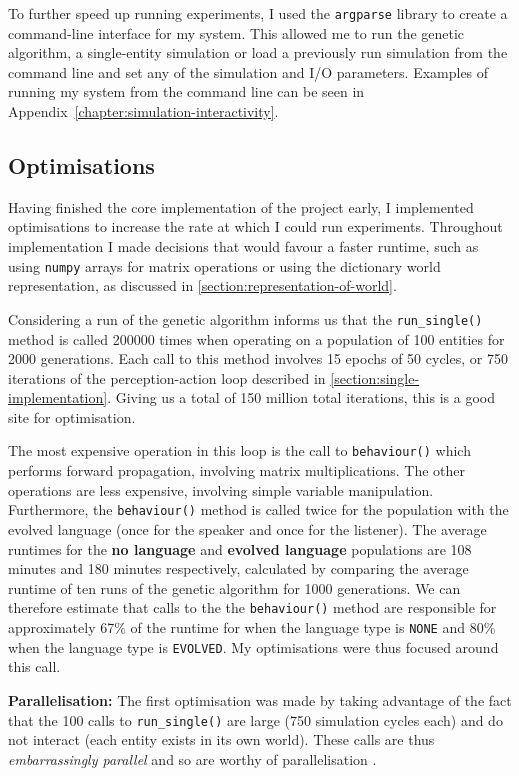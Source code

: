 \documentclass[12pt,a4paper]{report}
\begin{document}
To further speed up running experiments, I used the \texttt{argparse} library to create a command-line interface for my system. This allowed me to run the genetic algorithm, a single-entity simulation or load a previously run simulation from the command line and set any of the simulation and I/O parameters. Examples of running my system from the command line can be seen in Appendix~\ref{chapter:simulation-interactivity}.

\subsection{Optimisations}\label{section:optimisations}

Having finished the core implementation of the project early, I implemented optimisations to increase the rate at which I could run experiments. Throughout implementation I made decisions that would favour a faster runtime, such as using \verb|numpy| arrays for matrix operations or using the dictionary world representation, as discussed in \cref{section:representation-of-world}.

Considering a run of the genetic algorithm informs us that the \texttt{run\_single()} method is called 200000 times when operating on a population of 100 entities for 2000 generations. Each call to this method involves 15 epochs of 50 cycles, or 750 iterations of the perception-action loop described in \cref{section:single-implementation}. Giving us a total of 150 million total iterations, this is a good site for optimisation.

The most expensive operation in this loop is the call to \texttt{behaviour()} which performs forward propagation, involving matrix multiplications. The other operations are less expensive, involving simple variable manipulation. Furthermore, the \texttt{behaviour()} method is called twice for the population with the evolved language (once for the speaker and once for the listener). The average runtimes for the {\bf no language} and {\bf evolved language} populations are 108 minutes and 180 minutes respectively, calculated by comparing the average runtime of ten runs of the genetic algorithm for 1000 generations. We can therefore estimate that calls to the the \texttt{behaviour()} method are responsible for approximately 67\% of the runtime for when the language type is \texttt{NONE} and 80\% when the language type is \texttt{EVOLVED}. My optimisations were thus focused around this call.

{\bf Parallelisation:} The first optimisation was made by taking advantage of the fact that the 100 calls to \texttt{run\_single()} are large (750 simulation cycles each) and do not interact (each entity exists in its own world). These calls are thus \emph{embarrassingly parallel} and so are worthy of parallelisation \citep{mycroft2019}.
\end{document}
